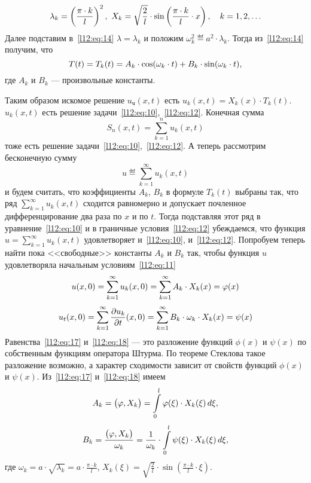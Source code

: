 \begin{equation*}
	\hfill\lambda_k=\left(\frac{\pi\cdot k}{l}\right)^2,\ X_k=\sqrt{\frac{2}{l}}\cdot\sin\left(\frac{\pi\cdot k}{l}\cdot x\right),\quad k=1,2,\ldots\hfill
\end{equation*}
Далее подставим в~\eqref{l12:eq:14} $\lambda=\lambda_k$ и положим $\omega^2_k\eqdef a^2\cdot\lambda_k$. Тогда из~\eqref{l12:eq:14} получим, что 
\begin{equation*}
	\hfill T(t)=T_k(t)=A_k\cdot\cos(\omega_k\cdot t)+B_k\cdot\sin(\omega_k\cdot t),\hfill
\end{equation*}
где $A_k$ и $B_k$ --- произвольные константы. 

Таким образом искомое решение $u_{\text{ч}}(x,t)$ есть $u_k(x,t)=X_k(x)\cdot T_k(t)$. $u_k(x,t)$ есть решение задачи~\eqref{l12:eq:10},~\eqref{l12:eq:12}. Конечная сумма 
\begin{equation*}
	S_n(x,t)=\sum\limits_{k=1}^n u_k(x,t) 
\end{equation*}
тоже есть решение задачи~\eqref{l12:eq:10},~\eqref{l12:eq:12}. А теперь рассмотрим бесконечную сумму 
\begin{equation*}
	u\eqdef\sum\limits_{k=1}^{\infty}u_k(x,t)
\end{equation*}
и будем считать, что коэффициенты $A_k$, $B_k$ в формуле $T_k(t)$ выбраны так, что ряд $\sum\limits_{k=1}^{\infty}u_k(x,t)$ сходится равномерно и допускает почленное дифференцирование два раза по $x$ и по $t$. Тогда подставляя этот ряд в уравнение~\eqref{l12:eq:10} и в граничные условия~\eqref{l12:eq:12} убеждаемся, что функция $u=\sum\limits_{k=1}^{\infty}u_k(x,t)$ удовлетворяет и~\eqref{l12:eq:10}, и~\eqref{l12:eq:12}. Попробуем теперь найти пока <<свободные>> константы $A_k$ и $B_k$ так, чтобы функция $u$ удовлетворяла начальным условиям~\eqref{l12:eq:11}
\begin{equation}
	\label{l12:eq:17}
	\hfill u(x,0)=\sum\limits_{k=1}^{\infty}u_k(x,0)=\sum\limits_{k=1}^{\infty}A_k\cdot X_k(x)=\phi(x)\hfill
\end{equation}
\begin{equation}
	\label{l12:eq:18}
	\hfill u_t(x,0)=\sum\limits_{k=1}^{\infty}\pder{u_k}{t}(x,0)=\sum\limits_{k=1}^{\infty}B_k\cdot\omega_k\cdot X_k(x)=\psi(x)\hfill
\end{equation}
Равенства~\eqref{l12:eq:17} и~\eqref{l12:eq:18} --- это разложение функций $\phi(x)$ и $\psi(x)$ по собственным функциям оператора Штурма. По теореме Стеклова такое разложение возможно, а характер сходимости зависит от свойств функций $\phi(x)$ и $\psi(x)$. Из~\eqref{l12:eq:17} и~\eqref{l12:eq:18} имеем 
\begin{equation*}
	\hfill A_k=\big(\phi,X_k\big)=\int\limits_0^l\phi(\xi)\cdot X_k(\xi)\,d\xi,\hfill
\end{equation*}
\begin{equation*}
	\hfill B_k=\frac{\big(\phi,X_k\big)}{\omega_k}=\frac{1}{\omega_k}\cdot\int\limits_0^l\psi(\xi)\cdot X_k(\xi)\,d\xi,\hfill
\end{equation*}
где $\omega_k=a\cdot\sqrt{\lambda_k}=a\cdot\frac{\pi\cdot k}{l}$, $X_k(\xi)=\sqrt{\frac{2}{l}}\cdot\sin\left(\frac{\pi\cdot k}{l}\cdot\xi\right)$.

